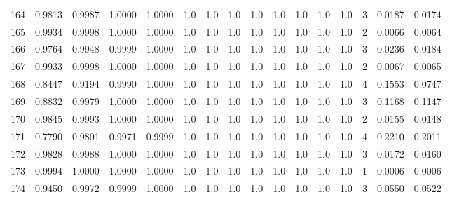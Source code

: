 \begin{tabular}{lrrrrrrrrrrrrrrr}
164 &      0.9813 &  0.9987 &  1.0000 &  1.0000 &     1.0 &     1.0 &     1.0 &     1.0 &     1.0 &     1.0 &      1.0 &        1.0 &      3 &                    0.0187 &                     0.0174 \\
165 &      0.9934 &  0.9998 &  1.0000 &  1.0000 &     1.0 &     1.0 &     1.0 &     1.0 &     1.0 &     1.0 &      1.0 &        1.0 &      2 &                    0.0066 &                     0.0064 \\
166 &      0.9764 &  0.9948 &  0.9999 &  1.0000 &     1.0 &     1.0 &     1.0 &     1.0 &     1.0 &     1.0 &      1.0 &        1.0 &      3 &                    0.0236 &                     0.0184 \\
167 &      0.9933 &  0.9998 &  1.0000 &  1.0000 &     1.0 &     1.0 &     1.0 &     1.0 &     1.0 &     1.0 &      1.0 &        1.0 &      2 &                    0.0067 &                     0.0065 \\
168 &      0.8447 &  0.9194 &  0.9990 &  1.0000 &     1.0 &     1.0 &     1.0 &     1.0 &     1.0 &     1.0 &      1.0 &        1.0 &      4 &                    0.1553 &                     0.0747 \\
169 &      0.8832 &  0.9979 &  1.0000 &  1.0000 &     1.0 &     1.0 &     1.0 &     1.0 &     1.0 &     1.0 &      1.0 &        1.0 &      3 &                    0.1168 &                     0.1147 \\
170 &      0.9845 &  0.9993 &  1.0000 &  1.0000 &     1.0 &     1.0 &     1.0 &     1.0 &     1.0 &     1.0 &      1.0 &        1.0 &      2 &                    0.0155 &                     0.0148 \\
171 &      0.7790 &  0.9801 &  0.9971 &  0.9999 &     1.0 &     1.0 &     1.0 &     1.0 &     1.0 &     1.0 &      1.0 &        1.0 &      4 &                    0.2210 &                     0.2011 \\
172 &      0.9828 &  0.9988 &  1.0000 &  1.0000 &     1.0 &     1.0 &     1.0 &     1.0 &     1.0 &     1.0 &      1.0 &        1.0 &      3 &                    0.0172 &                     0.0160 \\
173 &      0.9994 &  1.0000 &  1.0000 &  1.0000 &     1.0 &     1.0 &     1.0 &     1.0 &     1.0 &     1.0 &      1.0 &        1.0 &      1 &                    0.0006 &                     0.0006 \\
174 &      0.9450 &  0.9972 &  0.9999 &  1.0000 &     1.0 &     1.0 &     1.0 &     1.0 &     1.0 &     1.0 &      1.0 &        1.0 &      3 &                    0.0550 &                     0.0522 \\

\end{tabular}

